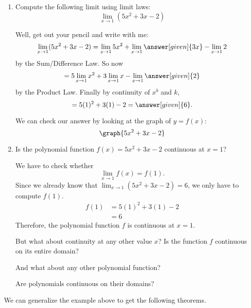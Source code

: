 \documentclass{ximera}
\begin{document}
\begin{example}
\begin{enumerate}
\item  Compute the following limit using limit laws:
\[
  \lim_{x\to 1}(5x^2+3x-2)
\]
\begin{explanation}
  Well, get out your pencil and write with me:
  \[
  \lim_{x\to 1} (5x^2+3x-2) = \lim_{x\to 1} 5x^2 + \lim_{x\to 1} \answer[given]{3x} - \lim_{x\to 1}2
  \]
  by the Sum/Difference Law. So now
  \[
  = 5\lim_{x\to 1} x^2 + 3\lim_{x\to 1} x - \lim_{x\to 1}\answer[given]{2}
  \]
  by the Product Law. Finally by continuity of $x^b$ and $k$,
  \[
  = 5(1)^2 + 3(1) - 2 =\answer[given]{6}.
  \]
  \begin{onlineOnly}
    We can check our answer by looking at the graph of $y=f(x)$:
    \[
    \graph{5x^2+3x-2}
    \]
  \end{onlineOnly}
\end{explanation}  
\item Is the polynomial function  $f(x)=5x^2+3x-2$ continuous at $x=1$?
\begin{explanation}
We have to check whether
\[
 \lim_{x\to 1} f(x)=f(1). 
\]
Since we already know that $ \lim_{x\to 1} (5x^2+3x-2)=6$,  we only have  to compute $f(1)$.
\begin{align*}
f(1)&=5(1)^2 + 3(1) - 2\\
&=6
\end{align*}
Therefore, the polynomial function $f$ is continuous at $x=1$.

But what about continuity at any other value $x$? Is the function $f$ continuous on its entire domain?

And what about any other polynomial function?

Are polynomials continuous on their domains?
\end{explanation}
\end{enumerate}
\end{example}

We can generalize the example above to get the following theorems.
\end{document}
